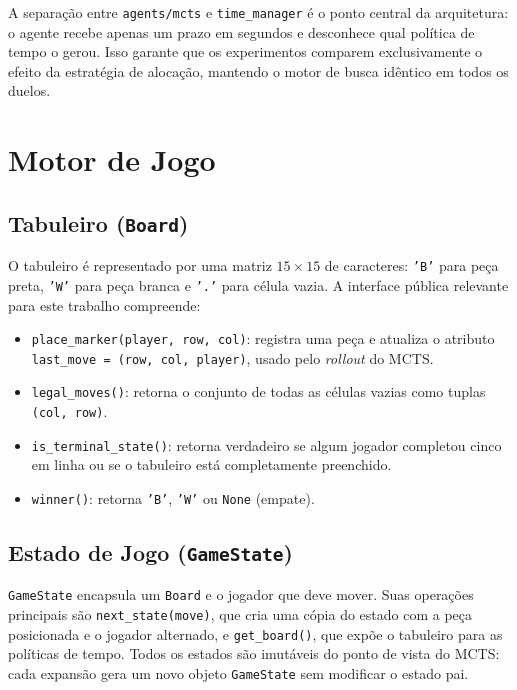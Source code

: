 \documentclass[cic,tc]{iiufrgs}
\begin{document}
A separação entre \texttt{agents/mcts} e \texttt{time\_manager} é o ponto central da arquitetura: o agente recebe apenas um prazo em segundos e desconhece qual política de tempo o gerou. Isso garante que os experimentos comparem exclusivamente o efeito da estratégia de alocação, mantendo o motor de busca idêntico em todos os duelos.

\section{Motor de Jogo}
\label{sec:impl_game}

\subsection{Tabuleiro (\texttt{Board})}
\label{sec:impl_board}

O tabuleiro é representado por uma matriz $15 \times 15$ de caracteres: \texttt{'B'} para peça preta, \texttt{'W'} para peça branca e \texttt{'.'} para célula vazia. A interface pública relevante para este trabalho compreende:

\begin{itemize}
    \item \texttt{place\_marker(player, row, col)}: registra uma peça e atualiza o atributo \texttt{last\_move = (row, col, player)}, usado pelo \emph{rollout} do MCTS.
    \item \texttt{legal\_moves()}: retorna o conjunto de todas as células vazias como tuplas \texttt{(col, row)}.
    \item \texttt{is\_terminal\_state()}: retorna verdadeiro se algum jogador completou cinco em linha ou se o tabuleiro está completamente preenchido.
    \item \texttt{winner()}: retorna \texttt{'B'}, \texttt{'W'} ou \texttt{None} (empate).
\end{itemize}

\subsection{Estado de Jogo (\texttt{GameState})}
\label{sec:impl_gamestate}

\texttt{GameState} encapsula um \texttt{Board} e o jogador que deve mover. Suas operações principais são \texttt{next\_state(move)}, que cria uma cópia do estado com a peça posicionada e o jogador alternado, e \texttt{get\_board()}, que expõe o tabuleiro para as políticas de tempo. Todos os estados são imutáveis do ponto de vista do MCTS: cada expansão gera um novo objeto \texttt{GameState} sem modificar o estado pai.
\end{document}
